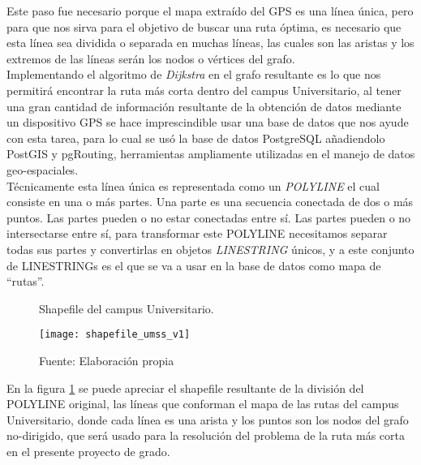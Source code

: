   Este paso fue necesario porque el mapa extraído del GPS es una línea única, pero para que nos sirva para el objetivo de buscar una ruta óptima, es necesario que esta línea sea dividida o separada en muchas líneas, las cuales son las aristas y los extremos de las líneas serán los nodos o vértices del grafo.\\

  Implementando el algoritmo de \emph{Dijkstra} en el grafo resultante es lo que nos permitir\'a encontrar la ruta más corta dentro del campus Universitario, al tener una gran cantidad de información resultante de la obtención de datos mediante un dispositivo GPS se hace imprescindible usar una base de datos que nos ayude con esta tarea, para lo cual se usó la base de datos PostgreSQL añadiendolo PostGIS y pgRouting, herramientas ampliamente utilizadas en el manejo de datos geo-espaciales.\\



  Técnicamente esta línea única es representada como un \emph{POLYLINE} el cual consiste en una o más partes. Una parte es una secuencia conectada de dos o más puntos. Las partes pueden o no estar conectadas entre sí. Las partes pueden o no intersectarse entre sí, para transformar este POLYLINE necesitamos separar todas sus partes y convertirlas en objetos \emph{LINESTRING} únicos, y a este conjunto de LINESTRINGs es el que se va a usar en la base de datos como mapa de ``rutas''.\cite{esri_shapefile}\\

  \begin{figure}[H]
    \begin{center}
      \caption{Shapefile del campus Universitario.}
      \label{fig:shapefile_umss_v1}
      \texttt{[image: shapefile\_umss\_v1]}
      \caption*{Fuente: Elaboración propia}
    \end{center}
  \end{figure}

  En la figura \ref{fig:shapefile_umss_v1} se puede apreciar el shapefile resultante de la división del POLYLINE original, las líneas que conforman el mapa de las rutas del campus Universitario, donde cada línea es una arista y los puntos son los nodos del grafo no-dirigido, que será usado para la resolución del problema de la ruta más corta en el presente proyecto de grado.\\

